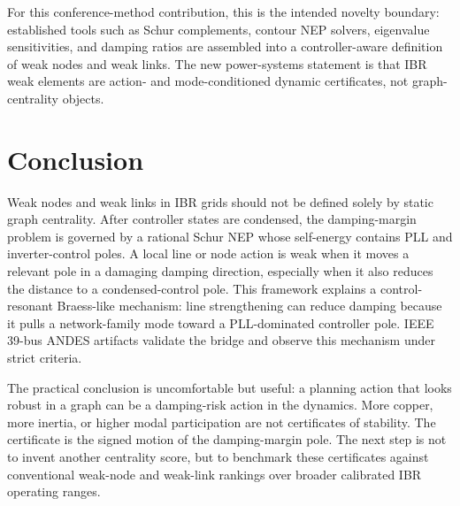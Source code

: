 \documentclass[conference]{IEEEtran}
\begin{document}
For this conference-method contribution, this is the intended novelty boundary:
established tools such as Schur complements, contour NEP solvers, eigenvalue
sensitivities, and damping ratios are assembled into a controller-aware
definition of weak nodes and weak links. The new power-systems statement is
that IBR weak elements are action- and mode-conditioned dynamic certificates,
not graph-centrality objects.

\section{Conclusion}

Weak nodes and weak links in IBR grids should not be defined solely by static graph centrality. After controller states are condensed, the damping-margin problem is governed by a rational Schur NEP whose self-energy contains PLL and inverter-control poles. A local line or node action is weak when it moves a relevant pole in a damaging damping direction, especially when it also reduces the distance to a condensed-control pole. This framework explains a control-resonant Braess-like mechanism: line strengthening can reduce damping because it pulls a network-family mode toward a PLL-dominated controller pole. IEEE 39-bus ANDES artifacts validate the bridge and observe this mechanism under strict criteria.

The practical conclusion is uncomfortable but useful: a planning action that
looks robust in a graph can be a damping-risk action in the dynamics. More
copper, more inertia, or higher modal participation are not certificates of
stability. The certificate is the signed motion of the damping-margin pole. The
next step is not to invent another centrality score, but to benchmark these
certificates against conventional weak-node and weak-link rankings over broader
calibrated IBR operating ranges.
\end{document}
